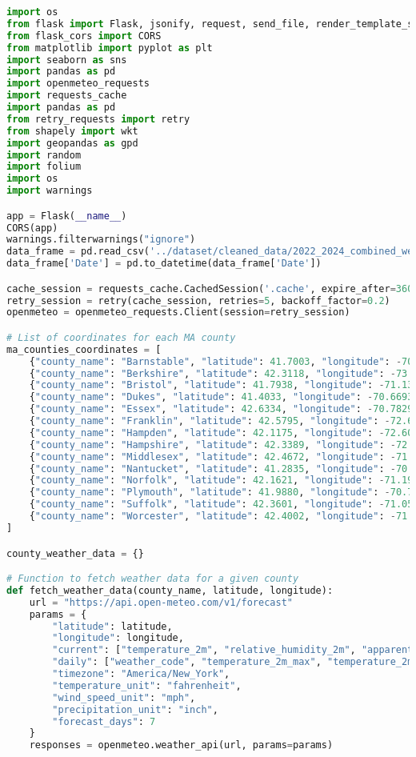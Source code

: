 \documentclass[a4paper, 12pt]{article}
\begin{document}
\begin{lstlisting}[language=Python, caption=Web Server code]
import os
from flask import Flask, jsonify, request, send_file, render_template_string
from flask_cors import CORS
from matplotlib import pyplot as plt
import seaborn as sns
import pandas as pd
import openmeteo_requests
import requests_cache
import pandas as pd
from retry_requests import retry
from shapely import wkt
import geopandas as gpd
import random
import folium
import os
import warnings

app = Flask(__name__)
CORS(app)
warnings.filterwarnings("ignore")
data_frame = pd.read_csv('../dataset/cleaned_data/2022_2024_combined_weather_data.csv')
data_frame['Date'] = pd.to_datetime(data_frame['Date'])

cache_session = requests_cache.CachedSession('.cache', expire_after=3600)
retry_session = retry(cache_session, retries=5, backoff_factor=0.2)
openmeteo = openmeteo_requests.Client(session=retry_session)

# List of coordinates for each MA county
ma_counties_coordinates = [
    {"county_name": "Barnstable", "latitude": 41.7003, "longitude": -70.3002},
    {"county_name": "Berkshire", "latitude": 42.3118, "longitude": -73.1822},
    {"county_name": "Bristol", "latitude": 41.7938, "longitude": -71.1350},
    {"county_name": "Dukes", "latitude": 41.4033, "longitude": -70.6693},
    {"county_name": "Essex", "latitude": 42.6334, "longitude": -70.7829},
    {"county_name": "Franklin", "latitude": 42.5795, "longitude": -72.6151},
    {"county_name": "Hampden", "latitude": 42.1175, "longitude": -72.6009},
    {"county_name": "Hampshire", "latitude": 42.3389, "longitude": -72.6417},
    {"county_name": "Middlesex", "latitude": 42.4672, "longitude": -71.2874},
    {"county_name": "Nantucket", "latitude": 41.2835, "longitude": -70.0995},
    {"county_name": "Norfolk", "latitude": 42.1621, "longitude": -71.1912},
    {"county_name": "Plymouth", "latitude": 41.9880, "longitude": -70.7528},
    {"county_name": "Suffolk", "latitude": 42.3601, "longitude": -71.0589},
    {"county_name": "Worcester", "latitude": 42.4002, "longitude": -71.9065}
]

county_weather_data = {}

# Function to fetch weather data for a given county
def fetch_weather_data(county_name, latitude, longitude):
    url = "https://api.open-meteo.com/v1/forecast"
    params = {
        "latitude": latitude,
        "longitude": longitude,
	    "current": ["temperature_2m", "relative_humidity_2m", "apparent_temperature", "precipitation", "weather_code", "wind_speed_10m", "wind_direction_10m", "wind_gusts_10m"],
	    "daily": ["weather_code", "temperature_2m_max", "temperature_2m_min", "sunrise", "sunset", "uv_index_max", "precipitation_probability_max", "wind_speed_10m_max", "wind_gusts_10m_max"],
        "timezone": "America/New_York",
        "temperature_unit": "fahrenheit",
        "wind_speed_unit": "mph",
        "precipitation_unit": "inch",
        "forecast_days": 7
    }
    responses = openmeteo.weather_api(url, params=params)


\end{lstlisting}
\end{document}
